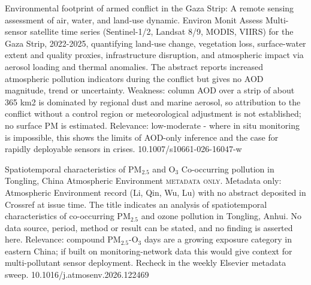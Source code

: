 \documentclass[10pt]{article}
\begin{document}
{Environmental footprint of armed conflict in the Gaza Strip: A remote sensing assessment of air, water, and land-use dynamic.}
{Environ Monit Assess}
{Multi-sensor satellite time series (Sentinel-1/2, Landsat 8/9, MODIS, VIIRS) for the Gaza Strip, 2022-2025, quantifying land-use change, vegetation loss, surface-water extent and quality proxies, infrastructure disruption, and atmospheric impact via aerosol loading and thermal anomalies. The abstract reports increased atmospheric pollution indicators during the conflict but gives no AOD magnitude, trend or uncertainty. Weakness: column AOD over a strip of about 365 km2 is dominated by regional dust and marine aerosol, so attribution to the conflict without a control region or meteorological adjustment is not established; no surface PM is estimated. Relevance: low-moderate - where in situ monitoring is impossible, this shows the limits of AOD-only inference and the case for rapidly deployable sensors in crises.}
{10.1007/s10661-026-16047-w}

{Spatiotemporal characteristics of PM$_{2.5}$ and O$_3$ Co-occurring pollution in Tongling, China}
{Atmospheric Environment}
{\textsc{metadata only.} Metadata only: Atmospheric Environment record (Li, Qin, Wu, Lu) with no abstract deposited in Crossref at issue time. The title indicates an analysis of spatiotemporal characteristics of co-occurring PM$_{2.5}$ and ozone pollution in Tongling, Anhui. No data source, period, method or result can be stated, and no finding is asserted here. Relevance: compound PM$_{2.5}$-O$_3$ days are a growing exposure category in eastern China; if built on monitoring-network data this would give context for multi-pollutant sensor deployment. Recheck in the weekly Elsevier metadata sweep.}
{10.1016/j.atmosenv.2026.122469}

\par{}\baselineskip{}\baselineskip
{}
\end{document}
